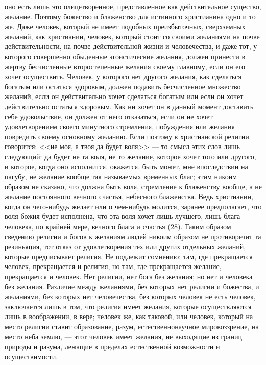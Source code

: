 \documentclass[12pt]{article}
\begin{document}
оно есть лишь это олицетворенное, представленное как действительное существо, желание. Поэтому божество и блаженство для истинного христианина одно и то же. Даже человек, который не имеет подобных преизбыточных, сверхземных желаний, как христианин, человек, который стоит со своими желаниями на почве действительности, на почве действительной жизни и человечества, и даже тот, у которого совершенно обыденные эгоистические желания, должен принести в жертву бесчисленные второстепенные желания своему главному, если он его хочет осуществить. Человек, у которого нет другого желания, как сделаться богатым или остаться здоровым, должен подавить бесчисленное множество желаний, если он действительно хочет сделаться богатым или если он хочет действительно остаться здоровым. Как ни хочет он в данный момент доставить себе удовольствие, он должен от него отказаться, если он не хочет удовлетворением своего минутного стремления, побуждения или желания повредить своему основному желанию. Если поэтому в христианской религии говорится: <<не моя, а твоя да будет воля>>  --- то смысл этих слов лишь следующий: да будет не та воля, не то желание, которое хочет того или другого, и которое, когда оно исполнится, окажется, быть может, мне впоследствии на пагубу, не желание вообще так называемых временных благ; этим никоим образом не сказано, что должна быть воля, стремление к блаженству вообще, а не желание постоянного вечного счастья, небесного блаженства. Ведь христианин, когда он чего-нибудь желает или о чем-нибудь молится, заранее предполагает, что воля божия будет исполнена, что эта воля хочет лишь лучшего, лишь блага человека, по крайней мере, вечного блага и счастья (28). Таким образом сведению религии и богов к желаниям людей никоим образом не противоречит та резиньяция, тот отказ от удовлетворения тех или других отдельных желаний, которые предписывает религия. Не подлежит сомнению: там, где прекращается человек, прекращается и религия, но там, где прекращается желание, прекращается и человек. Нет религии, нет бога без желания; но нет и человека без желания. Различие между желаниями, без которых нет религии и божества, и желаниями, без которых нет человечества, без которых человек не есть человек, заключается лишь в том, что религия имеет желания, которые осуществляются лишь в воображении, в вере; человек же, как таковой, или человек, который на место религии ставит образование, разум, естественнонаучное мировоззрение, на место неба землю, --- этот человек имеет желания, не выходящие из границ природы и разума, лежащие в пределах естественной возможности и осуществимости. 
\end{document}
